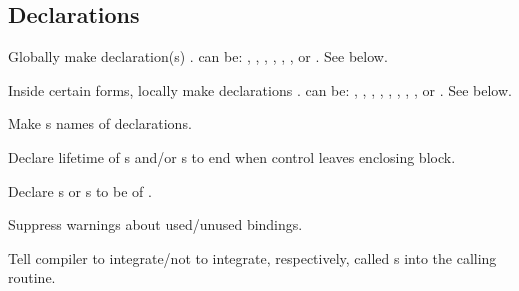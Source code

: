 \subsection{Declarations}
\begin{LIST}{1cm}

  {
  Globally make declaration(s) .  can be:
  ,      
  ,
  ,           
  ,   
  ,
  , or
  .
  See below.
  }

  {
    Inside certain forms, locally make declarations
    .  can be:
    ,
    ,
    ,           
    ,       
    ,     
    ,     
    ,  
    , or
    .
    See below.      
  }

  \begin{LIST}{.5cm}
    
    {
      Make s names of declarations.
    }
 
    {
      Declare lifetime of s and/or s to end
      when control leaves enclosing block.
    }


    {
      Declare s or s to be of .
    }

    {
    Suppress warnings about used/unused bindings.
  }

    {
    Tell compiler to integrate/not to integrate, respectively, called
    s into the calling routine.
  }


\end{LIST}
\end{LIST}
